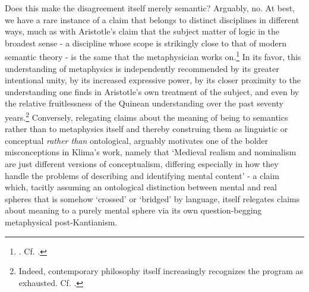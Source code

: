 \documentclass[]{article}
\begin{document}
Does this make the disagreement itself merely semantic? 
Arguably, no. 
At best, we have a rare instance of a claim that belongs to distinct disciplines in different ways, 
much as with Aristotle's claim that the subject matter of logic in the broadest sense - 
a discipline whose scope is strikingly close to that of modern semantic theory - 
is the same that the metaphysician works on.\footnote{\autocite[1004b 22-23]{Metaph}. Cf. \autocite[q. 3]{ScotusIsagoge}.}
In its favor, 
this understanding of metaphysics is independently recommended 
by its greater intentional unity, 
by its increased expressive power, 
by its closer proximity to the understanding one finds in Aristotle's own treatment of the subject, 
and even by the relative fruitlessness of the Quinean understanding over the past seventy years.\footnote{
Indeed, contemporary philosophy itself increasingly recognizes the program as exhausted. Cf. \autocite{Schaffer2009,Schaffer2016}.} 
Conversely, 
relegating claims about the meaning of being to semantics 
rather than to metaphysics itself 
and thereby construing them as linguistic or conceptual \emph{rather than} ontological, 
arguably motivates one of the bolder misconceptions in Klima's work, 
namely that 
`Medieval realism and nominalism are just different versions of conceptualism, differing especially in how they handle the problems of 
describing and identifying mental content' \autocite[110]{Klima2011} 
- a claim which, 
tacitly assuming an ontological distinction between mental and real spheres that is somehow `crossed' or `bridged' by language, 
itself relegates claims about meaning to a purely mental sphere via its own question-begging metaphysical post-Kantianism.

\printbibliography
\end{document}
